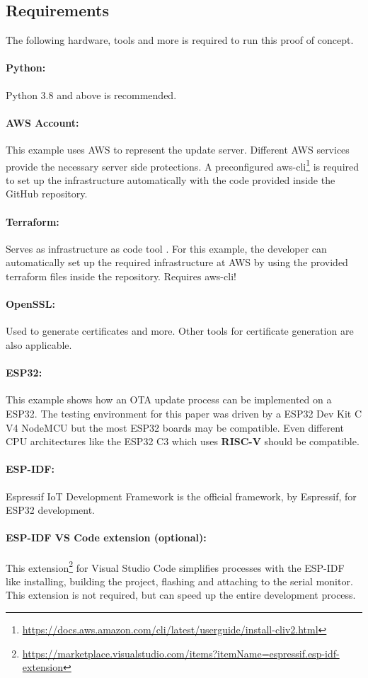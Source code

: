 \subsection{Requirements}
The following hardware, tools and more is required to run this proof of concept.

\paragraph{Python:} Python 3.8 and above is recommended.

\paragraph{AWS Account:} This example uses AWS to represent the update server. Different AWS services provide the necessary server side protections. A preconfigured aws-cli\footnote{\url{https://docs.aws.amazon.com/cli/latest/userguide/install-cliv2.html}} is required to set up the infrastructure automatically with the code provided inside the GitHub repository.

\paragraph{Terraform:} Serves as infrastructure as code tool \cite{HashiCorp}. For this example, the developer can automatically set up the required infrastructure at AWS by using the provided terraform files inside the repository. Requires aws-cli!

\paragraph{OpenSSL:} Used to generate certificates and more. Other tools for certificate generation are also applicable.

\paragraph{ESP32:} This example shows how an OTA update process can be implemented on a ESP32. The testing environment for this paper was driven by a ESP32 Dev Kit C V4 NodeMCU but the most ESP32 boards may be compatible. Even different CPU architectures like the ESP32 C3 which uses \textbf{RISC-V} should be compatible.

\paragraph{ESP-IDF:} Espressif IoT Development Framework is the official framework, by Espressif, for ESP32 development.

\paragraph{ESP-IDF VS Code extension (optional):} This extension\footnote{\url{https://marketplace.visualstudio.com/items?itemName=espressif.esp-idf-extension}} for Visual Studio Code simplifies processes with the ESP-IDF like installing, building the project, flashing and attaching to the serial monitor. This extension is not required, but can speed up the entire development process.
